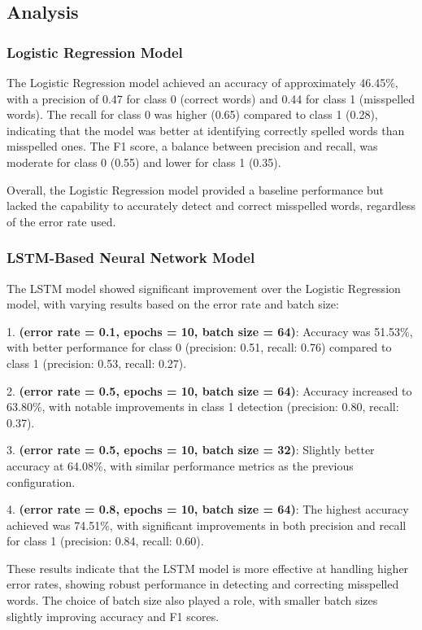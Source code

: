 \subsection{Analysis}

\subsubsection{Logistic Regression Model}

The Logistic Regression model achieved an accuracy of approximately 46.45\%, with a precision of 0.47 for class 0 (correct words) and 0.44 for class 1 (misspelled words). The recall for class 0 was higher (0.65) compared to class 1 (0.28), indicating that the model was better at identifying correctly spelled words than misspelled ones. The F1 score, a balance between precision and recall, was moderate for class 0 (0.55) and lower for class 1 (0.35).

Overall, the Logistic Regression model provided a baseline performance but lacked the capability to accurately detect and correct misspelled words, regardless of the error rate used.

\subsubsection{LSTM-Based Neural Network Model}

The LSTM model showed significant improvement over the Logistic Regression model, with varying results based on the error rate and batch size:

1. \textbf{(error rate = 0.1, epochs = 10, batch size = 64)}: Accuracy was 51.53\%, with better performance for class 0 (precision: 0.51, recall: 0.76) compared to class 1 (precision: 0.53, recall: 0.27).

2. \textbf{(error rate = 0.5, epochs = 10, batch size = 64)}: Accuracy increased to 63.80\%, with notable improvements in class 1 detection (precision: 0.80, recall: 0.37).

3. \textbf{(error rate = 0.5, epochs = 10, batch size = 32)}: Slightly better accuracy at 64.08\%, with similar performance metrics as the previous configuration.

4. \textbf{(error rate = 0.8, epochs = 10, batch size = 64)}: The highest accuracy achieved was 74.51\%, with significant improvements in both precision and recall for class 1 (precision: 0.84, recall: 0.60).

These results indicate that the LSTM model is more effective at handling higher error rates, showing robust performance in detecting and correcting misspelled words. The choice of batch size also played a role, with smaller batch sizes slightly improving accuracy and F1 scores.

